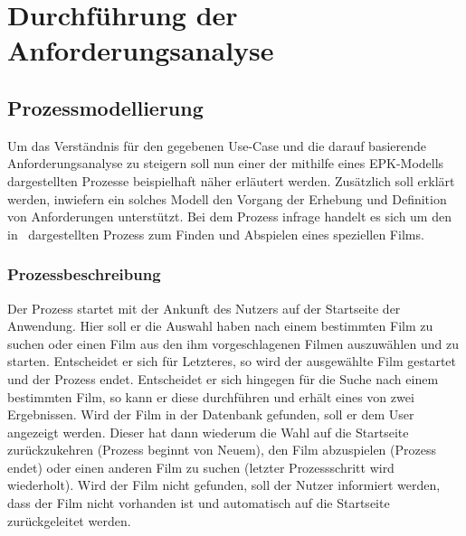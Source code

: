 \section{Durchführung der Anforderungsanalyse}\label{sec:durchfuhrung-der-anforderungsanalyse}

\subsection{Prozessmodellierung}\label{subsec:prozessmodelle}
Um das Verständnis für den gegebenen Use-Case und die darauf basierende Anforderungsanalyse zu steigern soll nun einer der
mithilfe eines EPK-Modells dargestellten Prozesse beispielhaft näher erläutert werden.
Zusätzlich soll erklärt werden, inwiefern ein solches Modell den Vorgang der Erhebung und Definition von Anforderungen
unterstützt.
Bei dem Prozess infrage handelt es sich um den in~ dargestellten Prozess zum Finden und Abspielen
eines speziellen Films.

\subsubsection{Prozessbeschreibung}\label{subsubsec:prozessbeschreibung}
Der Prozess startet mit der Ankunft des Nutzers auf der Startseite der Anwendung.
Hier soll er die Auswahl haben nach einem bestimmten Film zu suchen oder einen Film aus den ihm vorgeschlagenen Filmen
auszuwählen und zu starten.
Entscheidet er sich für Letzteres, so wird der ausgewählte Film gestartet und der Prozess endet.
Entscheidet er sich hingegen für die Suche nach einem bestimmten Film, so kann er diese durchführen und erhält eines von
zwei Ergebnissen.
Wird der Film in der Datenbank gefunden, soll er dem User angezeigt werden.
Dieser hat dann wiederum die Wahl auf die Startseite zurückzukehren (Prozess beginnt von Neuem), den Film abzuspielen
(Prozess endet) oder einen anderen Film zu suchen (letzter Prozessschritt wird wiederholt).
Wird der Film nicht gefunden, soll der Nutzer informiert werden, dass der Film nicht vorhanden ist und automatisch auf die
Startseite zurückgeleitet werden.

